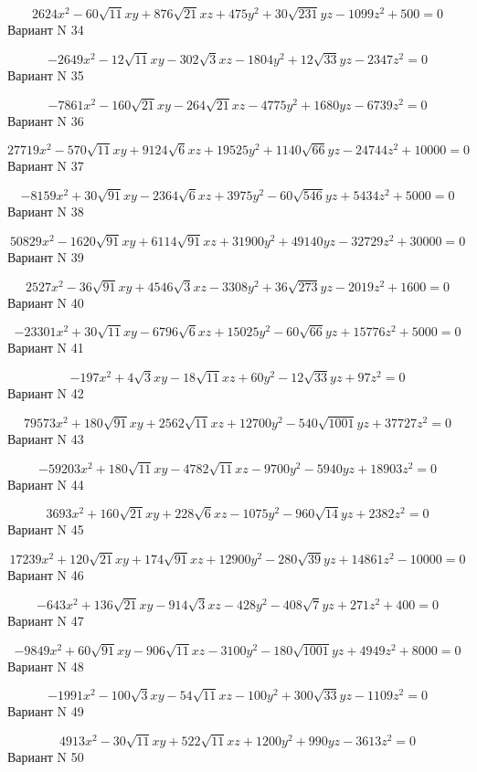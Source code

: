 \documentclass[11pt]{report}
\begin{document}
$$2624 x^{2} - 60 \sqrt{11} x y + 876 \sqrt{21} x z + 475 y^{2} + 30 \sqrt{231} y z - 1099 z^{2} + 500 = 0$$Вариант N 34

$$- 2649 x^{2} - 12 \sqrt{11} x y - 302 \sqrt{3} x z - 1804 y^{2} + 12 \sqrt{33} y z - 2347 z^{2} = 0$$Вариант N 35

$$- 7861 x^{2} - 160 \sqrt{21} x y - 264 \sqrt{21} x z - 4775 y^{2} + 1680 y z - 6739 z^{2} = 0$$Вариант N 36

$$27719 x^{2} - 570 \sqrt{11} x y + 9124 \sqrt{6} x z + 19525 y^{2} + 1140 \sqrt{66} y z - 24744 z^{2} + 10000 = 0$$Вариант N 37

$$- 8159 x^{2} + 30 \sqrt{91} x y - 2364 \sqrt{6} x z + 3975 y^{2} - 60 \sqrt{546} y z + 5434 z^{2} + 5000 = 0$$Вариант N 38

$$50829 x^{2} - 1620 \sqrt{91} x y + 6114 \sqrt{91} x z + 31900 y^{2} + 49140 y z - 32729 z^{2} + 30000 = 0$$Вариант N 39

$$2527 x^{2} - 36 \sqrt{91} x y + 4546 \sqrt{3} x z - 3308 y^{2} + 36 \sqrt{273} y z - 2019 z^{2} + 1600 = 0$$Вариант N 40

$$- 23301 x^{2} + 30 \sqrt{11} x y - 6796 \sqrt{6} x z + 15025 y^{2} - 60 \sqrt{66} y z + 15776 z^{2} + 5000 = 0$$Вариант N 41

$$- 197 x^{2} + 4 \sqrt{3} x y - 18 \sqrt{11} x z + 60 y^{2} - 12 \sqrt{33} y z + 97 z^{2} = 0$$Вариант N 42

$$79573 x^{2} + 180 \sqrt{91} x y + 2562 \sqrt{11} x z + 12700 y^{2} - 540 \sqrt{1001} y z + 37727 z^{2} = 0$$Вариант N 43

$$- 59203 x^{2} + 180 \sqrt{11} x y - 4782 \sqrt{11} x z - 9700 y^{2} - 5940 y z + 18903 z^{2} = 0$$Вариант N 44

$$3693 x^{2} + 160 \sqrt{21} x y + 228 \sqrt{6} x z - 1075 y^{2} - 960 \sqrt{14} y z + 2382 z^{2} = 0$$Вариант N 45

$$17239 x^{2} + 120 \sqrt{21} x y + 174 \sqrt{91} x z + 12900 y^{2} - 280 \sqrt{39} y z + 14861 z^{2} - 10000 = 0$$Вариант N 46

$$- 643 x^{2} + 136 \sqrt{21} x y - 914 \sqrt{3} x z - 428 y^{2} - 408 \sqrt{7} y z + 271 z^{2} + 400 = 0$$Вариант N 47

$$- 9849 x^{2} + 60 \sqrt{91} x y - 906 \sqrt{11} x z - 3100 y^{2} - 180 \sqrt{1001} y z + 4949 z^{2} + 8000 = 0$$Вариант N 48

$$- 1991 x^{2} - 100 \sqrt{3} x y - 54 \sqrt{11} x z - 100 y^{2} + 300 \sqrt{33} y z - 1109 z^{2} = 0$$Вариант N 49

$$4913 x^{2} - 30 \sqrt{11} x y + 522 \sqrt{11} x z + 1200 y^{2} + 990 y z - 3613 z^{2} = 0$$Вариант N 50
\end{document}
